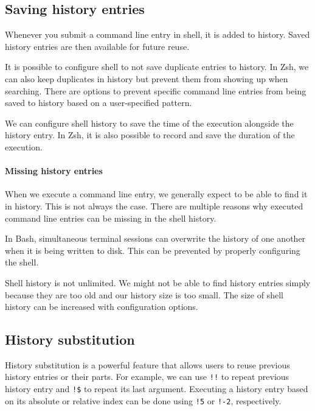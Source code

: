\subsection{Saving history entries}

Whenever you submit a command line entry in shell, it is added to history. Saved history entries are then available for future reuse. %

It is possible to configure shell to not save duplicate entries to history. 
In Zsh, we can also keep duplicates in history but prevent them from showing up when searching. 
There are options to prevent specific command line entries from being saved to history based on a user-specified pattern. %

We can configure shell history to save the time of the execution alongside the history entry. In Zsh, it is also possible to record and save the duration of the execution.

\paragraph{Missing history entries}

When we execute a command line entry, we generally expect to be able to find it in history. This is not always the case. There are multiple reasons why executed command line entries can be missing in the shell history.

In Bash, simultaneous terminal sessions can overwrite the history of one another when it is being written to disk.\cite{bashman}\cite{bash-session-issues-1} This can be prevented by properly configuring the shell.

Shell history is not unlimited. We might not be able to find history entries simply because they are too old and our history size is too small. The size of shell history can be increased with configuration options. %

\subsection{History substitution}

History substitution is a powerful feature that allows users to reuse previous history entries or their parts. 
For example, we can use \verb|!!| to repeat previous history entry and \verb|!$| to repeat its last argument. Executing a history entry based on its absolute or relative index can be done using \verb|!5| or \verb|!-2|, respectively.

